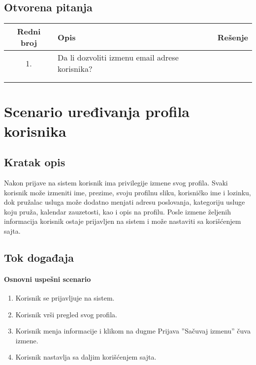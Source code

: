\documentclass[a4paper,12pt]{report}
\newcommand{\dativfunkcionalnosti}{uređivanja profila korisnika}
\begin{document}
\subsection{Otvorena pitanja}
    \begin{center}
    \begin{tabular}{ |c|p{10cm}|l| }
    \hline
    \textbf{Redni broj} & \hspace{4cm} \textbf{Opis} & \textbf{Rešenje} \\ 
    \hline
     1. & Da li dozvoliti izmenu email adrese korisnika? & \\
     \hline
      & &   \\
     \hline
     & &   \\
     \hline
    \end{tabular}
    \end{center}
\section{Scenario \dativfunkcionalnosti}
\subsection{Kratak opis}
    Nakon prijave na sistem korisnik ima privilegije izmene svog profila. Svaki korisnik može izmeniti ime, prezime, svoju profilnu sliku, korisničko ime i lozinku, dok pružalac usluga može dodatno menjati adresu poslovanja, kategoriju usluge koju pruža, kalendar zauzetosti, kao i opis na profilu. Posle izmene željenih informacija korisnik ostaje prijavljen na sistem i može nastaviti sa korišćenjem sajta.

\subsection{Tok događaja}
    \paragraph*{Osnovni uspešni scenario}
    \begin{enumerate}
        \item Korisnik se prijavljuje na sistem.
        \item Korisnik vrši pregled svog profila.
        \item Korisnik menja informacije i klikom na dugme Prijava ''Sačuvaj izmenu'' čuva izmene. 
        \item Korisnik nastavlja sa daljim korišćenjem sajta.
    \end{enumerate}
    
\end{document}

